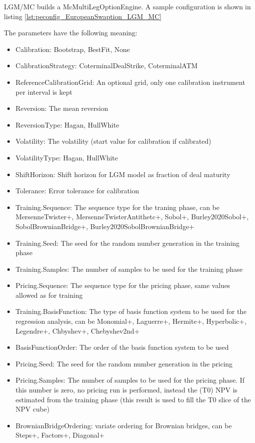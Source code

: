 LGM/MC builds a McMultiLegOptionEngine. A sample configuration is shown in
listing \ref{lst:peconfig_EuropeanSwaption_LGM_MC}

The parameters have the following meaning:

\begin{itemize}
\item Calibration: Bootstrap, BestFit, None
\item CalibrationStrategy: CoterminalDealStrike, CoterminalATM
\item ReferenceCalibrationGrid: An optional grid, only one calibration instrument per interval is kept
\item Reversion: The mean reversion
\item ReversionType: Hagan, HullWhite
\item Volatility: The volatility (start value for calibration if calibrated)
\item VolatilityType: Hagan, HullWhite
\item ShiftHorizon: Shift horizon for LGM model as fraction of deal maturity
\item Tolerance: Error tolerance for calibration
\item Training.Sequence: The sequence type for the traning phase, can be MersenneTwister+, MersenneTwisterAntithetc+,
  Sobol+, Burley2020Sobol+, SobolBrownianBridge+, Burley2020SobolBrownianBridge+
\item Training.Seed: The seed for the random number generation in the training phase
\item Training.Samples: The number of samples to be used for the training phase
\item Pricing.Sequence: The sequence type for the pricing phase, same values allowed as for training
\item Training.BasisFunction: The type of basis function system to be used for the regression analysis, can be
  Monomial+, Laguerre+, Hermite+, Hyperbolic+, Legendre+, Chbyshev+, Chebyshev2nd+
\item BasisFunctionOrder: The order of the basis function system to be used
\item Pricing.Seed: The seed for the random number generation in the pricing
\item Pricing.Samples: The number of samples to be used for the pricing phase. If this number is zero, no pricing run is
  performed, instead the (T0) NPV is estimated from the training phase (this result is used to fill the T0 slice of the
  NPV cube)
\item BrownianBridgeOrdering: variate ordering for Brownian bridges, can be Steps+, Factors+, Diagonal+

\end{itemize}
